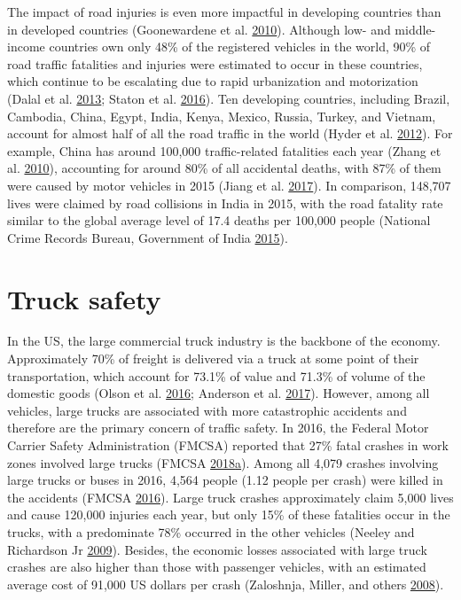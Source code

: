 \documentclass[12pt]{book}
\numberwithin{equation}{chapter}
\begin{document}
The impact of road injuries is even more impactful in developing countries than in developed countries (Goonewardene et al. \protect\hyperlink{ref-goonewardene2010road}{2010}).
Although low- and middle-income countries own only 48\% of the registered vehicles in the world, 90\% of road traffic fatalities and injuries were estimated to occur in these countries, which continue to be escalating due to rapid urbanization and motorization (Dalal et al. \protect\hyperlink{ref-dalal2013economics}{2013}; Staton et al. \protect\hyperlink{ref-staton2016road}{2016}).
Ten developing countries, including Brazil, Cambodia, China, Egypt, India, Kenya, Mexico, Russia, Turkey, and Vietnam, account for almost half of all the road traffic in the world (Hyder et al. \protect\hyperlink{ref-hyder2012addressing}{2012}).
For example, China has around 100,000 traffic-related fatalities each year (Zhang et al. \protect\hyperlink{ref-zhang2010road}{2010}), accounting for around 80\% of all accidental deaths, with 87\% of them were caused by motor vehicles in 2015 (Jiang et al. \protect\hyperlink{ref-jiang2017transport}{2017}).
In comparison, 148,707 lives were claimed by road collisions in India in 2015, with the road fatality rate similar to the global average level of 17.4 deaths per 100,000 people (National Crime Records Bureau, Government of India \protect\hyperlink{ref-india2015}{2015}).

\hypertarget{truck-safety}{%
\section{Truck safety}\label{truck-safety}}

In the US, the large commercial truck industry is the backbone of the economy. Approximately 70\% of freight is delivered via a truck at some point of their transportation, which account for 73.1\% of value and 71.3\% of volume of the domestic goods (Olson et al. \protect\hyperlink{ref-olson2016weight}{2016}; Anderson et al. \protect\hyperlink{ref-anderson2017exploratory}{2017}).
However, among all vehicles, large trucks are associated with more catastrophic accidents and therefore are the primary concern of traffic safety. In 2016, the Federal Motor Carrier Safety Administration (FMCSA) reported that 27\% fatal crashes in work zones involved large trucks (FMCSA \protect\hyperlink{ref-fmcsareport2016}{2018}\protect\hyperlink{ref-fmcsareport2016}{a}). Among all 4,079 crashes involving large trucks or buses in 2016, 4,564 people (1.12 people per crash) were killed in the accidents (FMCSA \protect\hyperlink{ref-fmcsafacts2016}{2016}). Large truck crashes approximately claim 5,000 lives and cause 120,000 injuries each year, but only 15\% of these fatalities occur in the trucks, with a predominate 78\% occurred in the other vehicles (Neeley and Richardson Jr \protect\hyperlink{ref-neeley2009effect}{2009}). Besides, the economic losses associated with large truck crashes are also higher than those with passenger vehicles, with an estimated average cost of 91,000 US dollars per crash (Zaloshnja, Miller, and others \protect\hyperlink{ref-zaloshnja2008unit}{2008}).
\end{document}
